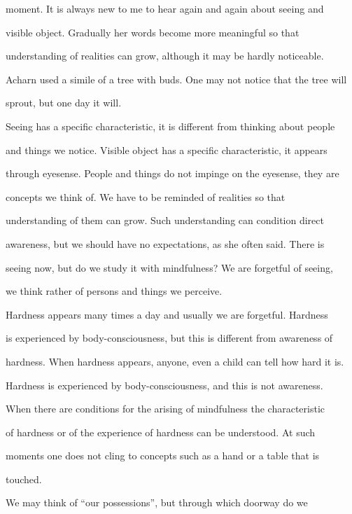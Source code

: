 moment.  It  is  always  new  to  me  to  hear  again  and  again  about  seeing  and  

visible   object.   Gradually   her   words   become   more   meaningful   so   that  

understanding  of  realities  can  grow,  although  it  may  be   hardly  noticeable.  

Acharn used a simile of a tree with buds. One may not notice that the tree will  

sprout, but one day it will. 

   Seeing has a specific characteristic, it is different from thinking about people  

and  things  we   notice. Visible  object  has  a  specific  characteristic,  it  appears  

through eyesense. People and things do not impinge on the eyesense, they are  

concepts   we   think   of.   We   have   to   be   reminded   of   realities   so   that  

understanding  of  them  can  grow.  Such  understanding  can  condition  direct  

awareness,  but we  should  have  no  expectations,  as  she  often  said.  There  is  

seeing now, but do we study it with mindfulness? We are forgetful of seeing,  

we think rather of persons and things we perceive. 

   Hardness appears many times a day and usually we are forgetful. Hardness  

is experienced by body-consciousness, but this is different from  awareness of  

hardness. When hardness appears, anyone, even a child can tell how hard it is.  

Hardness is experienced by body-consciousness, and this is not awareness. 

   When there  are conditions for the  arising of mindfulness the characteristic  

of  hardness   or   of  the   experience   of  hardness   can   be   understood.   At   such  

moments  one  does  not  cling  to  concepts  such  as  a  hand  or  a  table  that  is  

touched. 

   We  may  think   of  “our  possessions”,   but   through   which   doorway  do  we  

